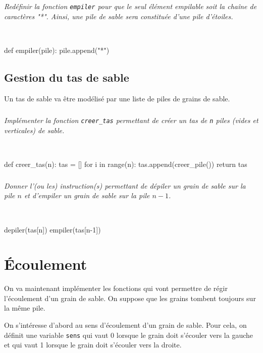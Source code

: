 \documentclass[10pt,fleqn]{article} %
\begin{document}
\subparagraph{}
\textit{Redéfinir la fonction \texttt{empiler} pour que le seul élément empilable soit la chaîne de caractères "*". Ainsi, une pile de sable sera constituée d'une pile d'étoiles. }
\ifprof
\begin{corrige}
~\\
\begin{python}
def empiler(pile):
    pile.append("*")
\end{python}

\end{corrige}
\else
\fi

\subsection{Gestion du tas de sable}
Un tas de sable va être modélisé par une liste de piles de grains de sable. 

\subparagraph{}\textit{Implémenter la fonction \texttt{creer\_tas} permettant de créer un tas de \texttt{n} piles (vides et verticales) de sable.}
\ifprof
\begin{corrige}~\\
\begin{python}
def creer_tas(n):
    tas = []
    for i in range(n):
        tas.append(creer_pile())
    return tas
\end{python}
\end{corrige}
\else
\fi

\subparagraph{}\textit{Donner l'(ou les) instruction(s) permettant de dépiler un grain de sable sur la pile $n$ et d'empiler un grain de sable sur la pile $n-1$.}
\ifprof
\begin{corrige}~\\
\begin{python}
depiler(tas[n])
empiler(tas[n-1])
\end{python}
\end{corrige}
\else
\fi

\section{Écoulement}
\ifprof
\else

On va maintenant implémenter les fonctions qui vont permettre de régir l'écoulement d'un grain de sable. On suppose que les grains tombent toujours sur la même pile. 

On s'intéresse d'abord au sens d'écoulement d'un grain de sable. Pour cela, on définit une variable \texttt{sens} qui vaut 0 lorsque le grain doit s'écouler vers la gauche et qui vaut 1 lorsque le grain doit s'écouler vers la droite. 
\end{document}
